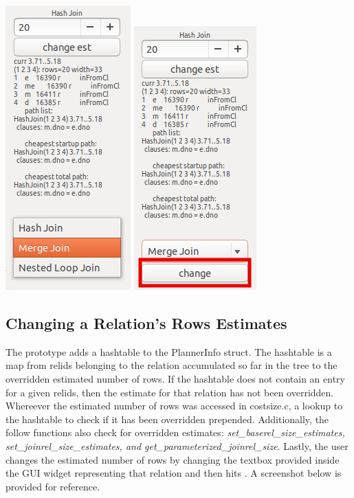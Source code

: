 \documentclass[letterpaper,10pt]{article}
\begin{document}
\begin{center}
\includegraphics[scale=0.5]{join-ddl.png}
\includegraphics[scale=0.5]{join-ddl-selected.png}
\end{center}

\subsection{Changing a Relation's Rows Estimates}
The prototype adds a hashtable to the PlannerInfo struct. The hashtable is a map
from relids belonging to the relation accumulated so far in the tree to the
overridden estimated number of rows. If the hashtable does not contain an entry
for a given relids, then the estimate for that relation has not been overridden.
Whereever the estimated number of rows was accessed in costsize.c, a lookup to
the hashtable to check if it has been overridden prepended. Additionally, the
follow functions also check for overridden estimates:
\textit{set\_baserel\_size\_estimates, set\_joinrel\_size\_estimates, and
get\_parameterized\_joinrel\_size}. Lastly, the user changes the estimated number of
rows by changing the textbox provided inside the GUI widget representing that
relation and then hits . A screenshot below is provided for reference.
\end{document}
